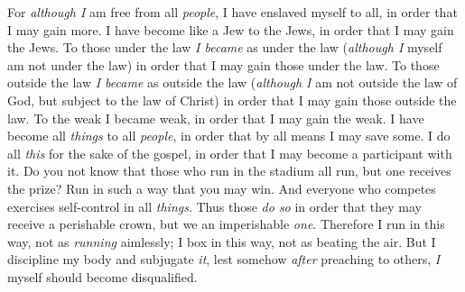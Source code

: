 \begin{biblechapter}
\verse For \textit{although I} am free from all \textit{people}, I have enslaved myself to all, in order that I may gain more.
\verse I have become like a Jew to the Jews, in order that I may gain the Jews. To those under the law \textit{I became} as under the law (\textit{although I} myself am not under the law) in order that I may gain those under the law.
\verse To those outside the law \textit{I became} as outside the law (\textit{although I} am not outside the law of God, but subject to the law of Christ) in order that I may gain those outside the law.
\verse To the weak I became weak, in order that I may gain the weak. I have become all \textit{things} to all \textit{people}, in order that by all means I may save some.
\verse I do all \textit{this} for the sake of the gospel, in order that I may become a participant with it.
\verse Do you not know that those who run in the stadium all run, but one receives the prize? Run in such a way that you may win.
\verse And everyone who competes exercises self-control in all \textit{things}. Thus those \textit{do so} in order that they may receive a perishable crown, but we an imperishable \textit{one}.
\verse Therefore I run in this way, not as \textit{running} aimlessly; I box in this way, not as beating the air.
\verse But I discipline my body and subjugate \textit{it}, lest somehow \textit{after} preaching to others, \textit{I} myself should become disqualified.
\end{biblechapter}

